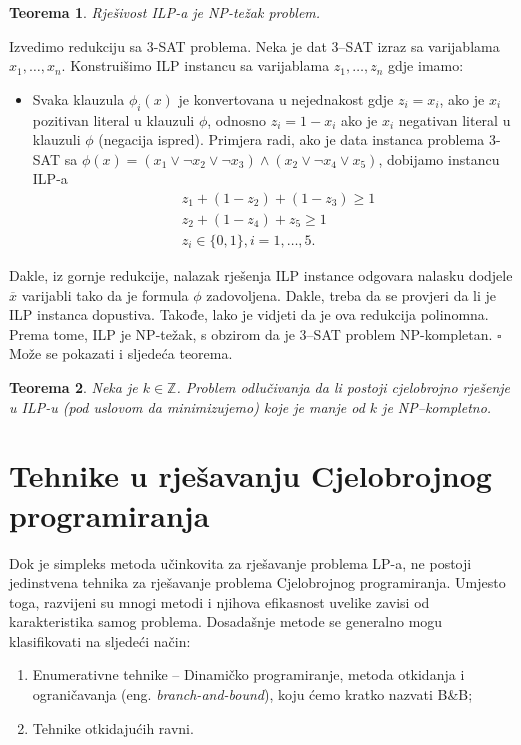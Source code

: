 \documentclass[a4paper, utf8, 11pt, colorlinks]{book}
\newtheorem{thm}{Teorema}
\newenvironment{proof}{{Dokaz:}}{\hfill$\square$}
\begin{document}
   \begin{thm}
   	  Rješivost ILP-a je NP-težak problem.
   \end{thm}
   \begin{proof}
   	   Izvedimo redukciju sa 3-SAT problema. Neka je dat 3--SAT izraz sa varijablama 
   	   $x_1,\ldots, x_n$.  Konstruišimo ILP instancu sa varijablama $z_1, \ldots, z_n$ gdje imamo:
   	   \begin{itemize}
   	   	   \item Svaka klauzula $\phi_i(x)$ je konvertovana u nejednakost gdje
   	   	      $z_i = x_i$, ako je $x_i$ pozitivan literal u klauzuli $\phi$, odnosno $z_i = 1 - x_i$ ako je $x_i$ negativan literal u klauzuli $\phi$ (negacija ispred). Primjera radi, ako je data instanca problema 3-SAT sa 
   	   	      $\phi(x) = (x_1 \vee \neg x_2 \vee \neg x_3) \wedge ( x_2 \vee \neg x_4 \vee x_5 )$, dobijamo instancu ILP-a
   	   	      \begin{align*}
   	   	         	 &z_1 + (1- z_2) + (1 - z_3 ) \geq 1 \\
   	   	         	 &z_2 + (1-z_4)  + z_5 \geq 1 \\
   	   	         	 & z_i \in \{0,1\}, i=1,\ldots,5.
   	   	      \end{align*} 
   	   \end{itemize}
   	   Dakle, iz gornje redukcije, nalazak rješenja ILP instance odgovara nalasku dodjele $\overline{x}$ varijabli tako da je formula $\phi$ zadovoljena. Dakle, treba da se provjeri da li je ILP instanca dopustiva. Takođe, lako je vidjeti da je ova redukcija polinomna. Prema tome, ILP je NP-težak, s obzirom da je 3--SAT problem NP-kompletan. 
   \end{proof} \\
 Može se pokazati i sljedeća teorema.
 \begin{thm} Neka je $k\in \mathbb{Z}$.
 	 Problem odlučivanja da li postoji cjelobrojno rješenje u ILP-u (pod uslovom da minimizujemo) koje je manje od $k$ je NP--kompletno. 
 \end{thm}


 \chapter{Tehnike u rješavanju Cjelobrojnog programiranja}
 
 Dok je simpleks metoda učinkovita za rješavanje  problema LP-a, ne postoji jedinstvena tehnika za rješavanje problema Cjelobrojnog programiranja. Umjesto toga, razvijeni su mnogi metodi i njihova efikasnost
 uvelike zavisi od karakteristika samog problema. Dosadašnje metode se generalno mogu klasifikovati na sljedeći način:
 \begin{enumerate}
     \item Enumerativne tehnike -- Dinamičko programiranje, metoda otkidanja i ograničavanja (eng. \emph{branch-and-bound}), koju ćemo kratko nazvati B\&B;
     \item Tehnike otkidajućih ravni.
 \end{enumerate}
\end{document}
